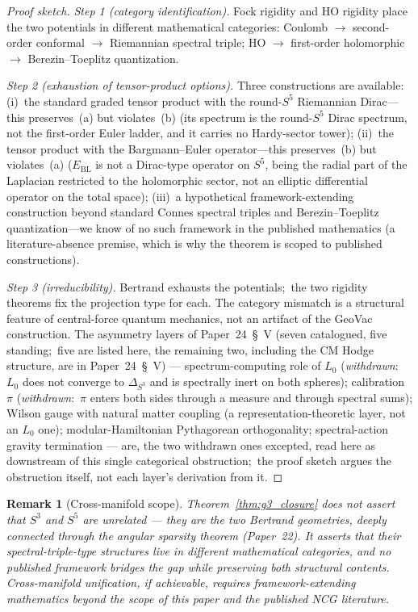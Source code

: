 \documentclass[11pt]{article}
\newtheorem{remark}{Remark}
\begin{document}
\begin{proof}[Proof sketch]
\emph{Step 1 (category identification).}
Fock rigidity and HO rigidity place the two potentials in different
mathematical categories: Coulomb $\to$ second-order conformal
$\to$ Riemannian spectral triple; HO $\to$ first-order
holomorphic $\to$ Berezin--Toeplitz quantization.

\emph{Step 2 (exhaustion of tensor-product options).}
Three constructions are available:
(i)~the standard graded tensor product with the round-$S^5$
Riemannian Dirac---this preserves~(a) but violates~(b)
(its spectrum is the round-$S^5$ Dirac spectrum, not the first-order
Euler ladder, and it carries no Hardy-sector tower);
(ii)~the tensor product with the Bargmann--Euler operator---this
preserves~(b) but violates~(a)
($E_{\mathrm{BL}}$ is not a Dirac-type operator on $S^5$,
being the radial part of the Laplacian restricted to the
holomorphic sector, not an elliptic differential operator
on the total space);
(iii)~a hypothetical framework-extending construction beyond
standard Connes spectral triples and Berezin--Toeplitz
quantization---we know of no such framework in the published
mathematics (a literature-absence premise, which is why the theorem is
scoped to published constructions).

\emph{Step 3 (irreducibility).}
Bertrand exhausts the potentials;\ the two rigidity theorems fix
the projection type for each.  The category mismatch is a
structural feature of central-force quantum mechanics, not an
artifact of the GeoVac construction.  The asymmetry layers of
Paper~24~\S~V (seven catalogued, five standing;\ five are listed here,
the remaining two, including the
CM Hodge structure, are in Paper~24~\S~V) --- spectrum-computing role of $L_0$ (\emph{withdrawn}:\
$L_0$ does not converge to $\Delta_{S^3}$ and is
spectrally inert on both spheres); calibration $\pi$ (\emph{withdrawn}:\
$\pi$ enters both sides through a measure and through spectral sums);
Wilson gauge
with natural matter coupling (a representation-theoretic layer, not an
$L_0$ one); modular-Hamiltonian Pythagorean orthogonality;
spectral-action gravity termination --- are, the two withdrawn ones
excepted, read here as downstream of this single categorical
obstruction;\ the proof sketch argues the obstruction itself, not each
layer's derivation from it.
\end{proof}

\begin{remark}[Cross-manifold scope]%
\label{rem:g3_scope}
Theorem~\ref{thm:g3_closure} does not assert that $S^3$ and $S^5$
are unrelated --- they are the two Bertrand geometries, deeply connected
through the angular sparsity theorem (Paper~22).  It asserts that their
\emph{spectral-triple-type structures} live in different mathematical
categories, and no published framework bridges the gap while preserving
both structural contents.  Cross-manifold unification, if achievable,
requires framework-extending mathematics beyond the scope of this paper
and the published NCG literature.
\end{remark}
\end{document}
